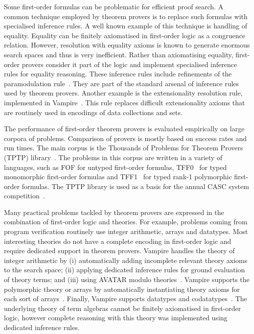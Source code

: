 Some first-order formulas can be problematic for efficient proof search. A common technique employed by theorem provers is to replace such formulas with specialised inference rules. A well known example of this technique is handling of equality. Equality can be finitely axiomatised in first-order logic as a congruence relation. However, resolution with equality axioms is known to generate enormous search spaces and thus is very inefficient. Rather than axiomatising equality, first-order provers consider it part of the logic and implement specialised inference rules for equality reasoning. These inference rules include refinements of the paramodulation rule~\cite{WRCS67,Robinson1969}. They are part of the standard arsenal of inference rules used by theorem provers. Another example is the extensionality resolution rule, implemented in Vampire~\cite{ATVA14}. This rule replaces difficult extensionality axioms that are routinely used in encodings of data collections and sets.

The performance of first-order theorem provers is evaluated empirically on large corpora of problems. Comparison of provers is mostly based on success rates and run times. The main corpus is the Thousands of Problems for Theorem Provers (TPTP) library~\cite{TPTP}. The problems in this corpus are written in a variety of languages, such as FOF for untyped first-order formulas, TFF0~\cite{tff0} for typed monomorphic first-order formulas and TFF1~\cite{tff1} for typed rank-1 polymorphic first-order formulas. The TPTP library is used as a basis for the annual CASC system competition~\cite{CASC}.

Many practical problems tackled by theorem provers are expressed in the combination of first-order logic and theories. For example, problems coming from program verification routinely use integer arithmetic, arrays and datatypes. Most interesting theories do not have a complete encoding in first-order logic and require dedicated support in theorem provers. Vampire handles the theory of integer arithmetic by (i) automatically adding incomplete relevant theory axioms to the search space; (ii) applying dedicated inference rules for ground evaluation of theory terms; and (iii) using AVATAR modulo theories~\cite{DBLP:conf/gcai/RegerB0V16}. Vampire supports the polymorphic theory or arrays by automatically instantiating theory axioms for each sort of arrays~\cite{VampireAndFOOL}. Finally, Vampire supports datatypes and co\-data\-types~\cite{BPR18}. The underlying theory of term algebras cannot be finitely axiomatised in first-order logic, however complete reasoning with this theory was implemented using dedicated inference rules.

